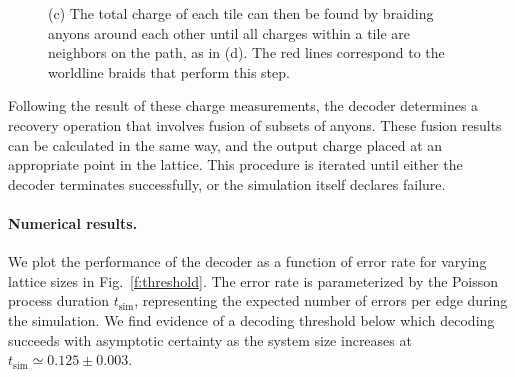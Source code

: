 \documentclass[aps, prl, letterpaper, twocolumn, superscriptaddress, notitlepage, 10pt]{revtex4-1}
\newcommand{\Fref}[1]{Fig.~\ref{#1}}
\begin{document}
\begin{figure}[t!]
\begin{center}
{%
(c) The total charge of each tile can then be found 
by braiding anyons around each other until all charges within 
a tile are neighbors on the path, as in (d).  
The red lines correspond to the worldline braids that perform this step.
}
\label{f:syndrome}
\end{center}
\vspace{-10pt}
\end{figure}

Following the result of these charge measurements, the decoder determines 
a recovery operation that involves fusion of subsets of anyons. 
These fusion results can be calculated in the same way, 
and the output charge placed at an appropriate point in the lattice. 
This procedure is iterated until either the decoder terminates successfully, 
or the simulation itself declares failure.


\paragraph{Numerical results.}

We plot the performance of the decoder as a function of error rate for varying lattice sizes in 
\Fref{f:threshold}. 
The error rate is parameterized by the Poisson process duration $t_{\mathrm{sim}}$, representing the expected number of errors per edge during the simulation. 
We find evidence of a decoding threshold below which decoding succeeds with asymptotic 
certainty as the system size increases at $t_{\mathrm{sim}}\simeq 0.125 \pm 0.003$.
\end{document}
